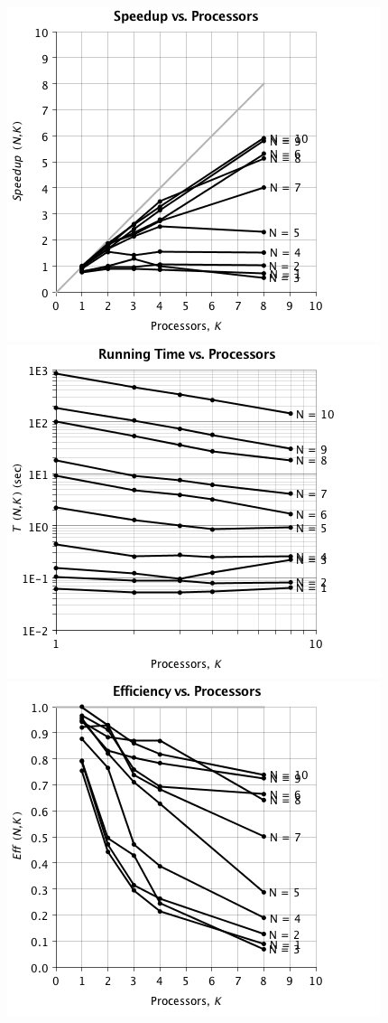 \begin{figure}
\begin{center}
\includegraphics[scale=0.35]{./chapter_optimize/t1u_speed_3.png}
\includegraphics[scale=0.35]{./chapter_optimize/t1u_speed_4.png}
\includegraphics[scale=0.35]{./chapter_optimize/t1u_speed_2.png}

\end{center}
\end{figure}

